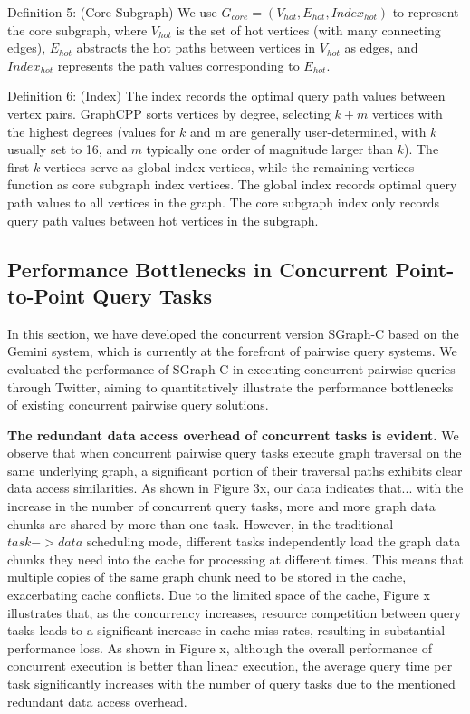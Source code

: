 \documentclass[lettersize,journal]{IEEEtran} %
\begin{document}
Definition 5: (Core Subgraph) We use $G_{core}=(V_{hot},E_{hot},Index_{hot})$ to represent the core subgraph, where $V_{hot}$ is the set of hot vertices (with many connecting edges), $E_{hot}$ abstracts the hot paths between vertices in $V_{hot}$ as edges, and $Index_{hot}$ represents the path values corresponding to $E_{hot}$.

Definition 6: (Index) The index records the optimal query path values between vertex pairs. GraphCPP sorts vertices by degree, selecting $k+m$ vertices with the highest degrees (values for $k$ and m are generally user-determined, with $k$ usually set to 16, and $m$ typically one order of magnitude larger than $k$). The first $k$ vertices serve as global index vertices, while the remaining vertices function as core subgraph index vertices. The global index records optimal query path values to all vertices in the graph. The core subgraph index only records query path values between hot vertices in the subgraph.

\subsection{Performance Bottlenecks in Concurrent Point-to-Point Query Tasks}
In this section, we have developed the concurrent version SGraph-C based on the Gemini system, which is currently at the forefront of pairwise query systems. We evaluated the performance of SGraph-C in executing concurrent pairwise queries through Twitter, aiming to quantitatively illustrate the performance bottlenecks of existing concurrent pairwise query solutions.

{\bf{The redundant data access overhead of concurrent tasks is evident.}} We observe that when concurrent pairwise query tasks execute graph traversal on the same underlying graph, a significant portion of their traversal paths exhibits clear data access similarities. As shown in Figure 3x, our data indicates that... with the increase in the number of concurrent query tasks, more and more graph data chunks are shared by more than one task. However, in the traditional $task->data$ scheduling mode, different tasks independently load the graph data chunks they need into the cache for processing at different times. This means that multiple copies of the same graph chunk need to be stored in the cache, exacerbating cache conflicts. Due to the limited space of the cache, Figure x illustrates that, as the concurrency increases, resource competition between query tasks leads to a significant increase in cache miss rates, resulting in substantial performance loss. As shown in Figure x, although the overall performance of concurrent execution is better than linear execution, the average query time per task significantly increases with the number of query tasks due to the mentioned redundant data access overhead.
\end{document}
